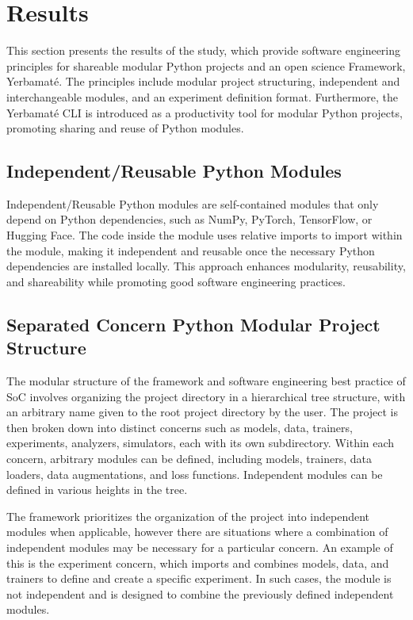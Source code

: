 \section{Results}

This section presents the results of the study, which provide software engineering principles for shareable modular Python projects and an open science Framework, Yerbamaté. The principles include modular project structuring, independent and interchangeable modules, and an experiment definition format.  Furthermore, the Yerbamaté CLI is introduced as a productivity tool for modular Python projects, promoting sharing and reuse of Python modules.


\subsection{Independent/Reusable Python Modules}

Independent/Reusable Python modules are self-contained modules that only depend on Python dependencies, such as NumPy, PyTorch, TensorFlow, or Hugging Face. The code inside the module uses relative imports to import within the module, making it independent and reusable once the necessary Python dependencies are installed locally. This approach enhances modularity, reusability, and shareability while promoting good software engineering practices.



\subsection{Separated Concern Python Modular Project Structure}


 The modular structure of the framework and software engineering best practice of SoC involves organizing the project directory in a hierarchical tree structure, with an arbitrary name given to the root project directory by the user. The project is then broken down into distinct concerns such as models, data, trainers, experiments, analyzers, simulators, each with its own subdirectory. Within each concern, arbitrary modules can be defined, including models, trainers, data loaders, data augmentations, and loss functions. Independent modules can be defined in various heights in the tree.

The framework prioritizes the organization of the project into independent modules when applicable, however there are situations where a combination of independent modules may be necessary for a particular concern. An example of this is the experiment concern, which imports and combines models, data, and trainers to define and create a specific experiment. In such cases, the module is not independent and is designed to combine the previously defined independent modules. 


